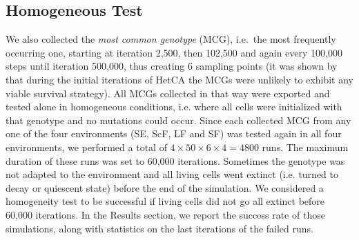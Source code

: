 \subsection{Homogeneous Test}
We also collected the \emph{most common genotype} (MCG), i.e.~the most frequently occurring one, starting at iteration 2,500, then 102,500 and again every 100,000 steps until iteration 500,000, thus creating 6 sampling points (it was shown by \citet{medernach2015evolutionary} that during the initial iterations of HetCA the MCGs were unlikely to exhibit any viable survival strategy). All MCGs collected in that way were exported and tested alone in homogeneous conditions, i.e. where all cells were initialized with that genotype and no mutations could occur. Since each collected MCG from any one of the four environments (SE, ScF, LF and SF) was tested again in all four environments, we performed a total of $4\times50\times6\times4=4800$ runs. The maximum duration of these runs was set to 60,000 iterations. Sometimes the genotype was not adapted to the environment and all living cells went extinct (i.e. turned to decay or quiescent state) before the end of the simulation. We considered a homogeneity test to be successful if living cells did not go all extinct before 60,000 iterations. In the Results section, we report the success rate of those simulations, along with statistics on the last iterations of the failed runs. 


